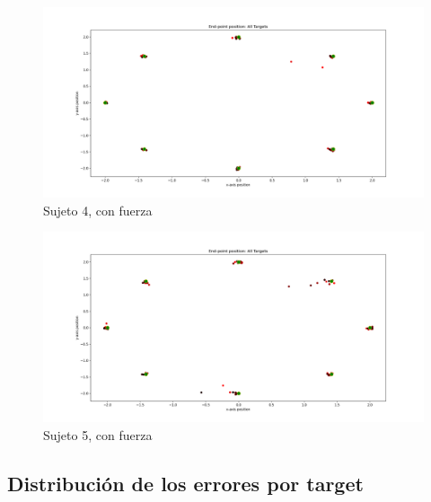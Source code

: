 \documentclass[a4paper,11pt, oneside]{book}
\begin{document}
\begin{figure}[H]
	\includegraphics[width=\linewidth]{sujeto4/force/trayectorias_puntos}
	\caption{Sujeto 4, con fuerza}
	\label{4-2-1}
\end{figure}
\begin{figure}[H]
	\includegraphics[width=\linewidth]{sujeto5/force/trayectorias_puntos}
	\caption{Sujeto 5, con fuerza}
	\label{5-2-1}
\end{figure}

\subsection{Distribución de los errores por target}
\label{anexo:3}
\end{document}
